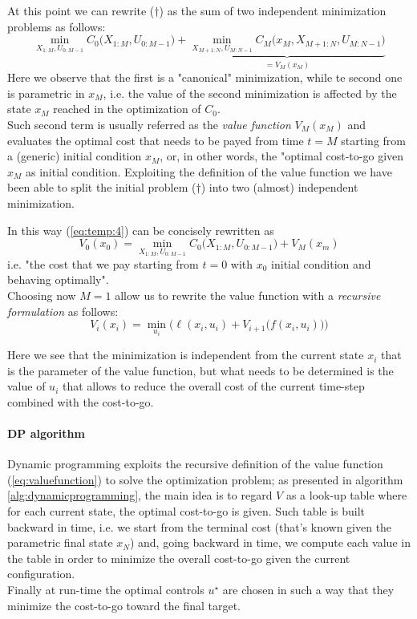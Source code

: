 	At this point we can rewrite ($\dagger$) as the sum of two independent minimization problems as follows:
	\begin{equation} \label{eq:temp:4}
		\min_{X_{1:M},U_{0:M-1}} C_0\big(X_{1:M},U_{0:M-1}\big) + \underbrace{\min_{X_{M+1:N},U_{M:N-1}} C_M\big(x_M, X_{M+1:N},U_{M:N-1}\big)}_{=V_M(x_M)}
	\end{equation}
	Here we observe that the first is a "canonical" minimization, while te second one is parametric in $x_M$, i.e. the value of the second minimization is affected by the state $x_M$ reached in the optimization of $C_0$.\\
	Such second term is usually referred as the \textit{value function} $V_M(x_M)$ and evaluates the optimal cost that needs to be payed from time $t=M$ starting from a (generic) initial condition $x_M$, or, in other words, the "optimal cost-to-go given $x_M$ as initial condition. Exploiting the definition of the value function we have been able to split the initial problem ($\dagger$) into two (almost) independent minimization.
	
	In this way (\ref{eq:temp:4}) can be concisely rewritten as
	\begin{equation}
		V_0(x_0) = \min_{X_{1:M},U_{0:M-1}} C_0\big(X_{1:M}, U_{0:M-1}\big) + V_M(x_m)
	\end{equation} 
	i.e. "the cost that we pay starting from $t=0$ with $x_0$ initial condition and behaving optimally".\\
	Choosing now $M=1$ allow us to rewrite the value function with a \textit{recursive formulation} as follows:
	\begin{equation} \label{eq:valuefunction}
		V_i(x_i) = \min_{u_i} \Big( \ell(x_i, u_i) + V_{i+1}\big(f(x_i, u_i)\big) \Big)
	\end{equation}
	
	Here we see that the minimization is independent from the current state $x_i$ that is the parameter of the value function, but what needs to be determined is the value of $u_i$ that allows to reduce the overall cost of the current time-step combined with the cost-to-go.
	
	\paragraph{DP algorithm} 
	Dynamic programming exploits the recursive definition of the value function (\ref{eq:valuefunction}) to solve the optimization problem; as presented in algorithm \ref{alg:dynamicprogramming}, the main idea is to regard $V$ as a look-up table where for each current state, the optimal cost-to-go is given. Such table is built backward in time, i.e. we start from the terminal cost (that's known given the parametric final state $x_N$) and, going backward in time, we compute each value in the table in order to minimize the overall cost-to-go given the current configuration.\\
	Finally at run-time the optimal controls $u^\star$ are chosen in such a way that they minimize the cost-to-go toward the final target.
	
